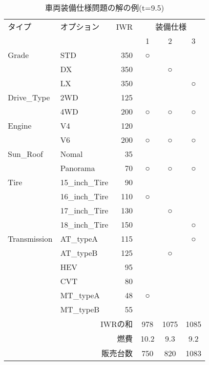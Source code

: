 \begin{table}
	\centering
	\caption{車両装備仕様問題の解の例(t=9.5)}
	\label{tab:output}
	\begin{tabular}{|l|l|r|c|c|c|} \cline{1-6}
	タイプ		& オプション 		& IWR	& \multicolumn{3}{c|}{装備仕様} \\\cline{4-6}
				&				&		& 1	& 2	& 3	\\\cline{1-6}
	Grade 		&STD 			& 350	& ○	&	&	\\\cline{2-6}
				& DX 			& 350	&	& ○	&	\\\cline{2-6}	
		 		& LX 			& 350  	& 	&	& ○	\\\cline{1-6}
	Drive\_Type 	& 2WD 			& 125	& 	&	&	\\\cline{2-6}
				& 4WD 			& 200	& ○	& ○	& ○	\\\cline{1-6}
	Engine		& V4 			& 120	&	&	&	\\\cline{2-6}
				& V6 			& 200	& ○	& ○	& ○	\\\cline{1-6}
	Sun\_Roof 	& Nomal 		& 35 	&	& 	&	\\\cline{2-6}
				& Panorama 		& 70	& ○	& ○	& ○	\\\cline{1-6}
	Tire			& 15\_inch\_Tire 	& 90	&	&	&	\\\cline{2-6}
				& 16\_inch\_Tire 	& 110	& ○	&	&	\\\cline{2-6}
	 			& 17\_inch\_Tire 	& 130	&	& ○	&	\\\cline{2-6}
	 			& 18\_inch\_Tire 	& 150	&	&	& ○	\\\cline{1-6}
	Transmission 	& AT\_typeA 		& 115	&	&	& ○	\\\cline{2-6}
			 	& AT\_typeB 		& 125	&	& ○	&	\\\cline{2-6}
			 	& HEV 			& 95	&	&	&	\\\cline{2-6}
			 	& CVT 			& 80	&	&	&	\\\cline{2-6}
			 	& MT\_typeA		& 48	& ○	&	&	\\\cline{2-6}
				& MT\_typeB		& 55	&	&	&	\\\cline{1-6}
	\multicolumn{3}{r}{IWRの和} & \multicolumn{1}{c}{978} & \multicolumn{1}{c}{1075} & \multicolumn{1}{c}{1085}\\ 
	\multicolumn{3}{r}{燃費} & \multicolumn{1}{c}{10.2} & \multicolumn{1}{c}{9.3} & \multicolumn{1}{c}{9.2}\\ 
	\multicolumn{3}{r}{販売台数} & \multicolumn{1}{c}{750} & \multicolumn{1}{c}{820} & \multicolumn{1}{c}{1083}\\ 

	\end{tabular}
\end{table}


